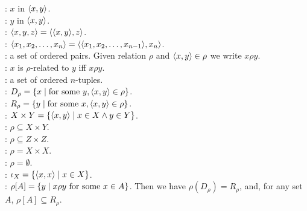 \documentclass[12pt]{book}
\begin{document}
: $x$ in $\langle x,y\rangle$.\\
: $y$ in $\langle x,y\rangle$.\\
: $\langle x,y,z\rangle = \langle\langle x,y\rangle,z\rangle$.\\
: $\langle x_1, x_2, \dots, x_n\rangle = \langle\langle x_1, x_2, \dots, x_{n-1}\rangle, x_n\rangle$.\\
: a set of ordered pairs. Given relation $\rho$ and $\langle x,y\rangle \in \rho$ we write $x\rho y$.\\
: $x$ is $\rho$-related to $y$ iff $x\rho y$.\\
: a set of ordered $n$-tuples.\\
: $D_{\rho} = \{x \mid \text{for some }y, \langle x,y\rangle\in \rho\}$.\\
: $R_{\rho} = \{y \mid \text{for some }x, \langle x,y\rangle\in \rho\}$.\\
: $X \times Y = \{\langle x,y\rangle \mid x \in X \wedge y \in Y\}$.\\
: $\rho \subseteq X \times Y$.\\
: $\rho \subseteq Z \times Z$.\\
: $\rho = X \times X$.\\
: $\rho = \emptyset$.\\
: $\iota_{X} = \{\langle x,x\rangle \mid x \in X\}$.\\
: $\rho[A]= \{y \mid x\rho y \text{ for some } x\in A\}$. Then we have $\rho(D_{\rho}) = R_{\rho}$, and, for any set $A$, $\rho[A] \subseteq R_{\rho}$.\\
\end{document}
